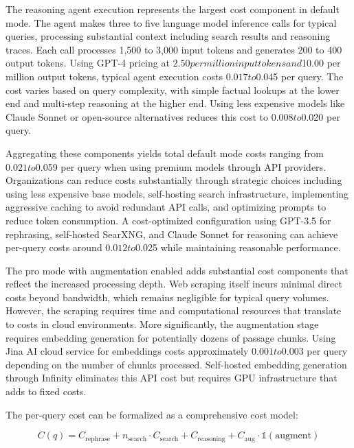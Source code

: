 The reasoning agent execution represents the largest cost component in default mode. The agent makes three to five language model inference calls for typical queries, processing substantial context including search results and reasoning traces. Each call processes 1,500 to 3,000 input tokens and generates 200 to 400 output tokens. Using GPT-4 pricing at $2.50 per million input tokens and $10.00 per million output tokens, typical agent execution costs $0.017 to $0.045 per query. The cost varies based on query complexity, with simple factual lookups at the lower end and multi-step reasoning at the higher end. Using less expensive models like Claude Sonnet or open-source alternatives reduces this cost to $0.008 to $0.020 per query.

Aggregating these components yields total default mode costs ranging from $0.021 to $0.059 per query when using premium models through API providers. Organizations can reduce costs substantially through strategic choices including using less expensive base models, self-hosting search infrastructure, implementing aggressive caching to avoid redundant API calls, and optimizing prompts to reduce token consumption. A cost-optimized configuration using GPT-3.5 for rephrasing, self-hosted SearXNG, and Claude Sonnet for reasoning can achieve per-query costs around $0.012 to $0.025 while maintaining reasonable performance.

The pro mode with augmentation enabled adds substantial cost components that reflect the increased processing depth. Web scraping itself incurs minimal direct costs beyond bandwidth, which remains negligible for typical query volumes. However, the scraping requires time and computational resources that translate to costs in cloud environments. More significantly, the augmentation stage requires embedding generation for potentially dozens of passage chunks. Using Jina AI cloud service for embeddings costs approximately $0.001 to $0.003 per query depending on the number of chunks processed. Self-hosted embedding generation through Infinity eliminates this API cost but requires GPU infrastructure that adds to fixed costs.

The per-query cost can be formalized as a comprehensive cost model:

\begin{equation}
C(q) = C_{\text{rephrase}} + n_{\text{search}} \cdot C_{\text{search}} + C_{\text{reasoning}} + C_{\text{aug}} \cdot \mathbb{1}(\text{augment})
\label{eq:cost_model}
\end{equation}

